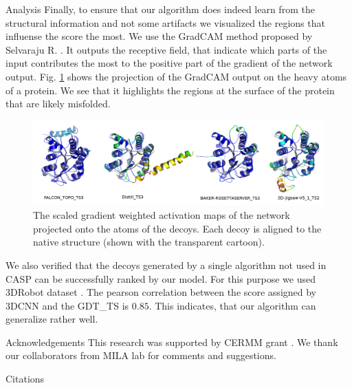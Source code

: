 \documentclass[final, unknownkeysallowed]{beamer}
\begin{document}
\begin{frame}{}
\begin{textblock}{39.0}
\begin{block}{Analysis}
Finally, to ensure that our algorithm does indeed learn from the structural information and not some artifacts we visualized 
the regions that influense the score the most.
We use the GradCAM method proposed by Selvaraju R. \cite{selvaraju2016grad}. 
It outputs the receptive field, that indicate which parts of the input contributes the most to the positive part of the gradient of the network output.
Fig. \ref{Fig:GradCAMT0776_more} shows the projection of the GradCAM output on the heavy atoms of a protein. 
We see that it highlights the regions at the surface of the protein that are likely misfolded.

\begin{figure}[H]
    \centering
    \includegraphics[width=\linewidth]{../draft/Fig/T0776.png}
    \caption{The scaled gradient weighted activation maps of the network projected onto the atoms of the decoys. 
    Each decoy is aligned to the native structure (shown with the transparent cartoon).}
    \label{Fig:GradCAMT0776_more}
\end{figure}

We also verified that the decoys generated by a single algorithm not used in CASP can be successfully ranked by our model.
For this purpose we used 3DRobot dataset \cite{deng20163drobot}. The pearson correlation between the score assigned by 
3DCNN and the GDT\_TS is $0.85$. This indicates, that our algorithm can generalize rather well.

\end{block}




\begin{block}{Acknowledgements}
This research was supported by CERMM grant .
We thank our collaborators from MILA lab for comments and suggestions.
\end{block}

\begin{block}{Citations}
{\small
{}}

\end{block}

\end{textblock}

\end{frame}
\end{document}
